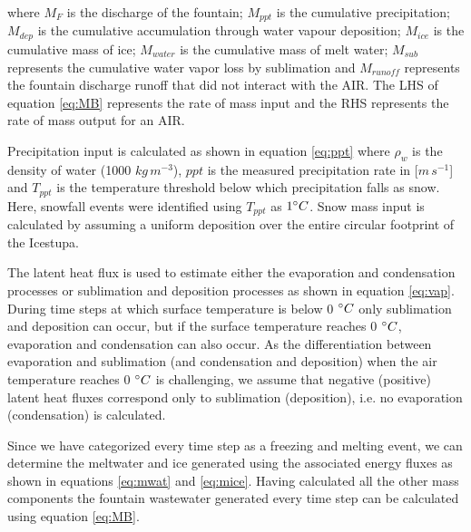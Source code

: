 \documentclass[utf8]{frontiersSCNS} %
\begin{document}
where $M_{F}$ is the discharge of the fountain; $M_{ppt}$ is the cumulative precipitation;  $M_{dep}$ is the cumulative
accumulation through water vapour deposition; $M_{ice}$ is the cumulative mass of ice; $M_{water}$ is the cumulative
mass of melt water; $M_{sub}$ represents the cumulative water vapor loss by sublimation and $M_{runoff}$ represents the
fountain discharge runoff that did not interact with the AIR. The LHS of equation \ref{eq:MB} represents the rate of
mass input and the RHS represents the rate of mass output for an AIR. 

Precipitation input is calculated as shown in equation \ref{eq:ppt} where $\rho_{w}$ is the density of water (1000
$kg\,m^{-3}$), $ppt$ is the measured precipitation rate in [$m\,s^{-1}$] and $T_{ppt}$ is the temperature threshold
below which precipitation falls as snow. Here, snowfall events were identified using $T_{ppt}$ as $1 \degree C$. Snow
mass input is calculated by assuming a uniform deposition over the entire circular footprint of the Icestupa. 

The latent heat flux is used to estimate either the evaporation and condensation processes or sublimation and deposition
processes as shown in equation \ref{eq:vap}. During time steps at which surface temperature is below 0 $\degree C$ only
sublimation and deposition can occur, but if the surface temperature reaches 0 $\degree C$, evaporation and condensation
can also occur. As the differentiation between evaporation and sublimation (and condensation and deposition) when the
air temperature reaches 0 $\degree C$ is challenging, we assume that negative (positive) latent heat fluxes correspond
only to sublimation (deposition), i.e. no evaporation (condensation) is calculated.

Since we have categorized every time step as a freezing and melting event, we can determine the meltwater and  ice
generated using the associated energy fluxes as shown in equations \ref{eq:mwat} and \ref{eq:mice}. Having
calculated all the other mass components the fountain wastewater generated every time step can be calculated using
equation \ref{eq:MB}.
\end{document}
